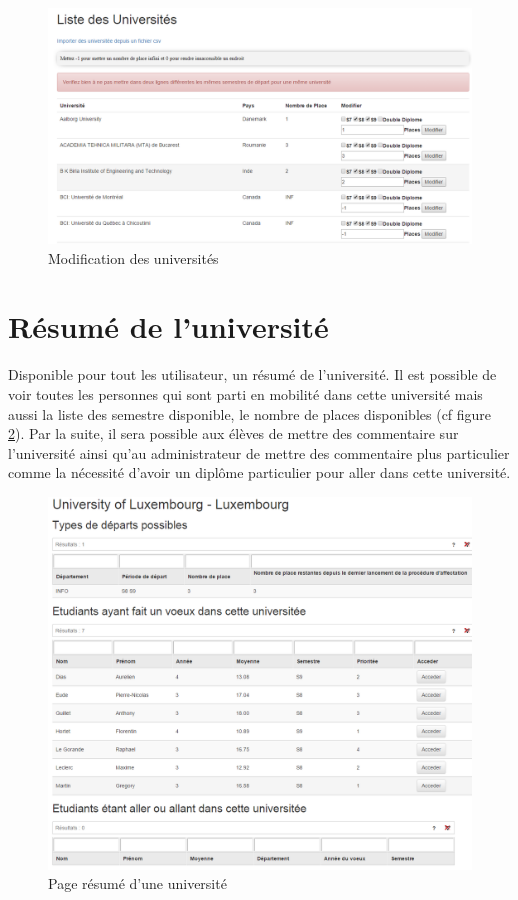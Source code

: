 \begin{figure}[H]
	\centering
	\includegraphics[scale=0.35]{images/mu.png}
	\caption{Modification des universités}
	\label{mu}
\end{figure}

\section{Résumé de l'université}

Disponible pour tout les utilisateur, un résumé de l'université. Il est possible de voir toutes les personnes qui sont parti en mobilité dans cette université mais aussi la liste des semestre disponible, le nombre de places disponibles (cf figure \ref{fru}).
\smallbreak
Par la suite, il sera possible aux élèves de mettre des commentaire sur l'université ainsi qu'au administrateur de mettre des commentaire plus particulier comme la nécessité d'avoir un diplôme particulier pour aller dans cette université.

\begin{figure}[H]
	\centering
	\includegraphics[scale=0.30]{images/fru.png}
	\caption{Page résumé d'une université}
	\label{fru}
\end{figure}


